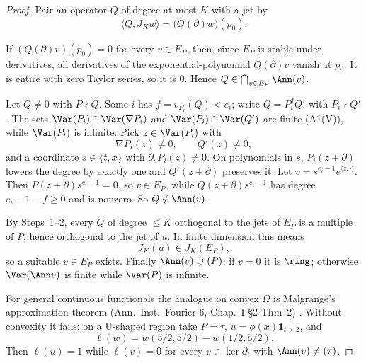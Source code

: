 \begin{proof}
Pair an operator $Q$ of degree at most $K$ with a jet by
\[
\langle Q,J_Kw\rangle=\big(Q(\partial)w\big)(p_0).
\]

If $(Q(\partial)v)(p_0)=0$ for every $v\in E_P$, then, since $E_P$ is stable under derivatives, all derivatives of the exponential-polynomial $Q(\partial)v$ vanish at $p_0$. It is entire with zero Taylor series, so it is $0$. Hence $Q\in\bigcap_{v\in E_P}\Ann(v)$.

Let $Q\ne0$ with $P\nmid Q$. Some $i$ has $f=v_{P_i}(Q)<e_i$; write $Q=P_i^fQ'$ with $P_i\nmid Q'$. The sets $\Var(P_i)\cap\Var(\nabla P_i)$ and $\Var(P_i)\cap\Var(Q')$ are finite (A1(V)), while $\Var(P_i)$ is infinite. Pick $z\in\Var(P_i)$ with
\[
\nabla P_i(z)\ne0,\qquad Q'(z)\ne0,
\]
and a coordinate $s\in\{t,x\}$ with $\partial_sP_i(z)\ne0$. On polynomials in $s$, $P_i(z+\partial)$ lowers the degree by exactly one and $Q'(z+\partial)$ preserves it. Let $v=s^{e_i-1}e^{\langle z,\cdot\rangle}$. Then $P(z+\partial)s^{e_i-1}=0$, so $v\in E_P$, while $Q(z+\partial)s^{e_i-1}$ has degree $e_i-1-f\ge0$ and is nonzero. So $Q\notin\Ann(v)$.

By Steps~1--2, every $Q$ of degree $\le K$ orthogonal to the jets of $E_P$ is a multiple of $P$, hence orthogonal to the jet of $u$. In finite dimension this means
\[
J_K(u)\in J_K(E_P),
\]
so a suitable $v\in E_P$ exists. Finally $\Ann(v)\supsetneq(P)$: if $v=0$ it is $\ring$; otherwise $\Var(\Ann v)$ is finite while $\Var(P)$ is infinite.

For general continuous functionals the analogue on convex $\Omega$ is Malgrange's approximation theorem (Ann.\ Inst.\ Fourier 6, Chap.~I \S2 Thm~2) \cf. Without convexity it fails: on a U-shaped region take $P=\tau$, $u=\phi(x)\mathbf 1_{t>2}$, and
\[
\ell(w)=w(5/2,5/2)-w(1/2,5/2).
\]
Then $\ell(u)=1$ while $\ell(v)=0$ for every $v\in\ker\partial_t$ with $\Ann(v)\ne(\tau)$.

\end{proof}

